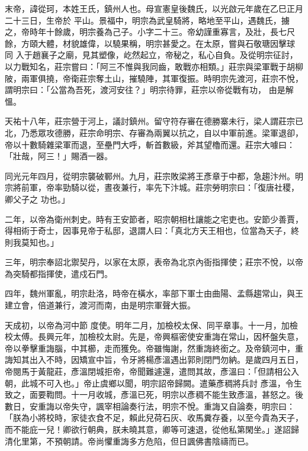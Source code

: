 
\begin{pinyinscope}

 末帝，諱從珂，本姓王氏，鎮州人也。母宣憲皇後魏氏，以光啟元年歲在乙巳正月二十三日，生帝於
 平山。景福中，明宗為武皇騎將，略地至平山，遇魏氏，擄之，帝時年十餘歲，明宗養為己子。小字二十三。帝幼謹重寡言，及壯，長七尺餘，方頤大體，材貌雄偉，以驍果稱，明宗甚愛之。在太原，嘗與石敬瑭因擊球
 同
 入于趙襄子之廟，見其塑像，屹然起立，帝秘之，私心自負。及從明宗征討，以力戰知名，莊宗嘗曰：「阿三不惟與我同齒，敢戰亦相類。」莊宗與梁軍戰于胡柳陂，兩軍俱撓，帝衛莊宗奪土山，摧驍陣，其軍復振。時明宗先渡河，莊宗不悅，謂明宗曰：「公當為吾死，渡河安往？」明宗待罪，莊宗以帝從戰有功，
 由是解慍。



 天祐十八年，莊宗營于河上，議討鎮州。留守符存審在德勝寨未行，梁人謂莊宗已北，乃悉眾攻德勝，莊宗命明宗、存審為兩翼以抗之，自以中軍前進。梁軍退卻，帝以十數騎雜梁軍而退，至壘門大呼，斬首數級，斧其望櫓而還。莊宗大噱曰：「壯哉，阿三！」賜酒一器。



 同光元年四月，從明宗襲破鄆州。九月，莊宗敗梁將王彥章于中都，急趨汴州。明宗將前軍，帝率勁騎以從，晝夜兼行，率先下汴城。莊宗勞明宗曰：「復唐社稷，卿父子之
 功也。」



 二年，以帝為衛州刺史。時有王安節者，昭宗朝相杜讓能之宅吏也。安節少善賈，得相術于奇士，因事見帝于私邸，退謂人曰：「真北方天王相也，位當為天子，終則我莫知也。」



 三年，明宗奉詔北禦契丹，以家在太原，表帝為北京內衙指揮使；莊宗不悅，以帝為突騎都指揮使，遣戍石門。



 四年，魏州軍亂，明宗赴洛，時帝在橫水，率部下軍士由曲陽、孟縣趨常山，與王建立會，倍道兼行，渡河而南，由是明宗軍聲大振。



 天成初，以帝為河中節
 度使。明年二月，加檢校太保、同平章事。十一月，加檢校太傅。長興元年，加檢校太尉。先是，帝興樞密使安重誨在常山，因杯盤失意，帝以拳擊重誨腦，中其櫛，走而獲免。帝雖悔謝，然重誨終銜之。及帝鎮河中，重誨知其出入不時，因矯宣中旨，令牙將楊彥溫遇出郭則閉門勿納。是歲四月五日，帝閱馬于黃龍莊，彥溫閉城拒帝，帝聞難遽還，遣問其故，彥溫曰：「但請相公入朝，此城不可入也。」帝止虞鄉以聞，明宗詔帝歸闕。遣藥彥稠將兵討
 彥溫，令生致之，面要鞫問。十一月收城，彥溫已死，明宗以彥稠不能生致彥溫，甚怒之。後數日，安重誨以帝失守，諷宰相論奏行法，明宗不悅。重誨又自論奏，明宗曰：「朕為小將校時，家徒衣食不足，賴此兒荷石灰、收馬糞存養，以至今貴為天子，而不能庇一兒！卿欲行朝典，朕未曉其意，卿等可速退，從他私第閑坐。」遂詔歸清化里第，不預朝請。帝尚懼重誨多方危陷，但日諷佛書陰禱而已。




\end{pinyinscope}
